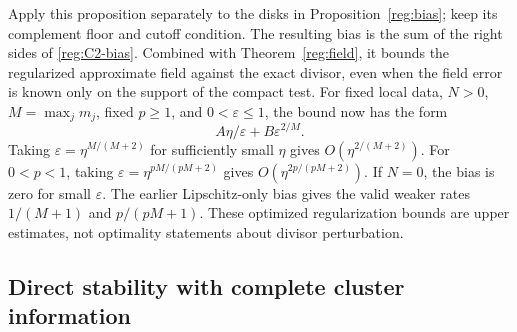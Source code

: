Apply this proposition separately to the disks in
Proposition~\ref{reg:bias}; keep its complement floor and cutoff
condition. The resulting bias is the sum of the right sides of
\eqref{reg:C2-bias}. Combined with Theorem~\ref{reg:field}, it bounds
the regularized approximate field against the exact divisor, even when
the field error is known only on the support of the compact test.
For fixed local data, $N>0$, $M=\max_jm_j$, fixed $p\ge1$, and
$0<\varepsilon\le1$, the bound now has the form
\begin{equation}\label{reg:balance}
 A\eta/\varepsilon+B\varepsilon^{2/M}.
\end{equation}
Taking $\varepsilon=\eta^{M/(M+2)}$ for sufficiently small $\eta$
gives $O(\eta^{2/(M+2)})$. For $0<p<1$, taking
$\varepsilon=\eta^{pM/(pM+2)}$ gives
$O(\eta^{2p/(pM+2)})$. If $N=0$, the bias is zero for small
$\varepsilon$. The earlier Lipschitz-only bias gives the valid weaker
rates $1/(M+1)$ and $p/(pM+1)$. These optimized regularization
bounds are upper estimates, not optimality statements about divisor
perturbation.

\subsection{Direct stability with complete cluster information}

